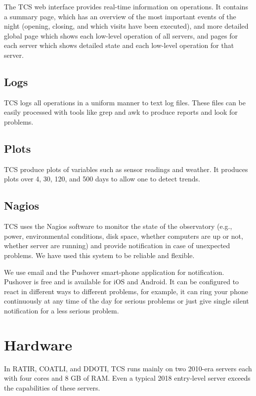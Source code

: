 \documentclass{article}
\begin{document}
The TCS web interface provides real-time information on operations. It contains a summary page, which has an overview of the most important events of the night (opening, closing, and which visits have been executed), and more detailed global page which shows each low-level operation of all servers, and pages for each server which shows detailed state and each low-level operation for that server.

\subsection{Logs}

TCS logs all operations in a uniform manner to text log files. These files can be easily processed with tools like grep and awk to produce reports and look for problems.

\subsection{Plots}

TCS produce plots of variables such as sensor readings and weather. It produces plots over 4, 30, 120, and 500 days to allow one to detect trends.

\subsection{Nagios}

TCS uses the Nagios software to monitor the state of the observatory (e.g., power, environmental conditions, disk space, whether computers are up or not, whether server are running) and provide notification in case of unexpected problems. We have used this system  to be reliable and flexible.

We use email and the Pushover smart-phone application for notification. Pushover is free and is available for iOS and Android. It can be configured to react in different ways to different problems, for example, it can ring your phone continuously at any time of the day for serious problems or just give single silent notification for a less serious problem.

\section{Hardware}

In RATIR, COATLI, and DDOTI, TCS runs mainly on two 2010-era servers each with four cores and 8 GB of RAM. Even a typical 2018 entry-level server exceeds the capabilities of these servers.
\end{document}
